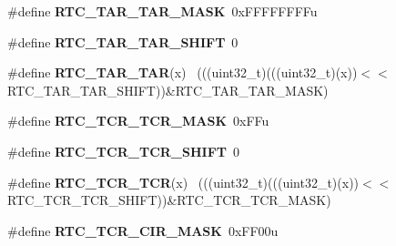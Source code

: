 \begin{DoxyCompactItemize}
\item 
\hypertarget{group___r_t_c___register___masks_ga649a76416ad00079054bd866565dada2}{}\#define {\bfseries R\+T\+C\+\_\+\+T\+A\+R\+\_\+\+T\+A\+R\+\_\+\+M\+A\+S\+K}~0x\+F\+F\+F\+F\+F\+F\+F\+Fu\label{group___r_t_c___register___masks_ga649a76416ad00079054bd866565dada2}

\item 
\hypertarget{group___r_t_c___register___masks_ga9ec8791d91dc36f0f59a7705988f7278}{}\#define {\bfseries R\+T\+C\+\_\+\+T\+A\+R\+\_\+\+T\+A\+R\+\_\+\+S\+H\+I\+F\+T}~0\label{group___r_t_c___register___masks_ga9ec8791d91dc36f0f59a7705988f7278}

\item 
\hypertarget{group___r_t_c___register___masks_ga817df24c688f5b9031ce69c919c9337f}{}\#define {\bfseries R\+T\+C\+\_\+\+T\+A\+R\+\_\+\+T\+A\+R}(x)                                                  ~(((uint32\+\_\+t)(((uint32\+\_\+t)(x))$<$$<$R\+T\+C\+\_\+\+T\+A\+R\+\_\+\+T\+A\+R\+\_\+\+S\+H\+I\+F\+T))\&R\+T\+C\+\_\+\+T\+A\+R\+\_\+\+T\+A\+R\+\_\+\+M\+A\+S\+K)\label{group___r_t_c___register___masks_ga817df24c688f5b9031ce69c919c9337f}

\item 
\hypertarget{group___r_t_c___register___masks_ga48a96d1de8db1993bfac3ca9d6bdb227}{}\#define {\bfseries R\+T\+C\+\_\+\+T\+C\+R\+\_\+\+T\+C\+R\+\_\+\+M\+A\+S\+K}~0x\+F\+Fu\label{group___r_t_c___register___masks_ga48a96d1de8db1993bfac3ca9d6bdb227}

\item 
\hypertarget{group___r_t_c___register___masks_ga0d8bc8c79b8010b8ebb94562428713fe}{}\#define {\bfseries R\+T\+C\+\_\+\+T\+C\+R\+\_\+\+T\+C\+R\+\_\+\+S\+H\+I\+F\+T}~0\label{group___r_t_c___register___masks_ga0d8bc8c79b8010b8ebb94562428713fe}

\item 
\hypertarget{group___r_t_c___register___masks_gae677a99c22f7ba8c9c872446e4d8dc09}{}\#define {\bfseries R\+T\+C\+\_\+\+T\+C\+R\+\_\+\+T\+C\+R}(x)                                                  ~(((uint32\+\_\+t)(((uint32\+\_\+t)(x))$<$$<$R\+T\+C\+\_\+\+T\+C\+R\+\_\+\+T\+C\+R\+\_\+\+S\+H\+I\+F\+T))\&R\+T\+C\+\_\+\+T\+C\+R\+\_\+\+T\+C\+R\+\_\+\+M\+A\+S\+K)\label{group___r_t_c___register___masks_gae677a99c22f7ba8c9c872446e4d8dc09}

\item 
\hypertarget{group___r_t_c___register___masks_ga8f198d1dbc7427e1dfabdc4e9f53f8e2}{}\#define {\bfseries R\+T\+C\+\_\+\+T\+C\+R\+\_\+\+C\+I\+R\+\_\+\+M\+A\+S\+K}~0x\+F\+F00u\label{group___r_t_c___register___masks_ga8f198d1dbc7427e1dfabdc4e9f53f8e2}


\end{DoxyCompactItemize}
